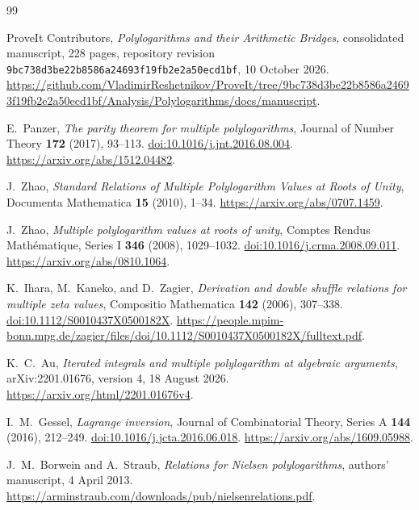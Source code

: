 \documentclass[11pt]{article}
\numberwithin{equation}{section}
\theoremstyle{plain}
\theoremstyle{definition}
\theoremstyle{remark}
\newcommand{\basecommit}{\nolinkurl{9bc738d3be22b8586a24693f19fb2e2a50ecd1bf}}
\begin{document}
\begin{thebibliography}{99}

ProveIt Contributors,
\emph{Polylogarithms and their Arithmetic Bridges}, consolidated
manuscript, 228 pages, repository revision
\basecommit, 10 October 2026.
\url{https://github.com/VladimirReshetnikov/ProveIt/tree/9bc738d3be22b8586a24693f19fb2e2a50ecd1bf/Analysis/Polylogarithms/docs/manuscript}.

E.~Panzer,
\emph{The parity theorem for multiple polylogarithms},
Journal of Number Theory \textbf{172} (2017), 93--113.
\href{https://doi.org/10.1016/j.jnt.2016.08.004}{doi:10.1016/j.jnt.2016.08.004}.
\url{https://arxiv.org/abs/1512.04482}.

J.~Zhao,
\emph{Standard Relations of Multiple Polylogarithm Values at Roots of Unity},
Documenta Mathematica \textbf{15} (2010), 1--34.
\url{https://arxiv.org/abs/0707.1459}.

J.~Zhao,
\emph{Multiple polylogarithm values at roots of unity},
Comptes Rendus Math\'ematique, Series I \textbf{346} (2008), 1029--1032.
\href{https://doi.org/10.1016/j.crma.2008.09.011}{doi:10.1016/j.crma.2008.09.011}.
\url{https://arxiv.org/abs/0810.1064}.

K.~Ihara, M.~Kaneko, and D.~Zagier,
\emph{Derivation and double shuffle relations for multiple zeta values},
Compositio Mathematica \textbf{142} (2006), 307--338.
\href{https://doi.org/10.1112/S0010437X0500182X}{doi:10.1112/S0010437X0500182X}.
\url{https://people.mpim-bonn.mpg.de/zagier/files/doi/10.1112/S0010437X0500182X/fulltext.pdf}.

K.~C.~Au,
\emph{Iterated integrals and multiple polylogarithm at algebraic arguments},
arXiv:2201.01676, version 4, 18 August 2026.
\url{https://arxiv.org/html/2201.01676v4}.

I.~M.~Gessel,
\emph{Lagrange inversion},
Journal of Combinatorial Theory, Series A \textbf{144} (2016), 212--249.
\href{https://doi.org/10.1016/j.jcta.2016.06.018}{doi:10.1016/j.jcta.2016.06.018}.
\url{https://arxiv.org/abs/1609.05988}.

J.~M.~Borwein and A.~Straub,
\emph{Relations for Nielsen polylogarithms}, authors' manuscript,
4 April 2013.
\url{https://arminstraub.com/downloads/pub/nielsenrelations.pdf}.

\end{thebibliography}
\end{document}
